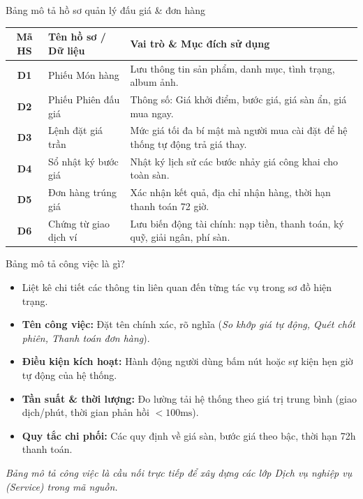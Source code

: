 \documentclass[aspectratio=169, 10pt]{beamer}
\begin{document}
\begin{frame}{Bảng mô tả hồ sơ quản lý đấu giá \& đơn hàng}
    \small
    \begin{table}[h]
        \centering
        \begin{tabular}{c l p{7.5cm}}
            \toprule
            \textbf{Mã HS} & \textbf{Tên hồ sơ / Dữ liệu} & \textbf{Vai trò \& Mục đích sử dụng} \\
            \midrule
            \textbf{D1} & Phiếu Món hàng & Lưu thông tin sản phẩm, danh mục, tình trạng, album ảnh. \\
            \textbf{D2} & Phiếu Phiên đấu giá & Thông số: Giá khởi điểm, bước giá, giá sàn ẩn, giá mua ngay. \\
            \textbf{D3} & Lệnh đặt giá trần & Mức giá tối đa bí mật mà người mua cài đặt để hệ thống tự động trả giá thay. \\
            \textbf{D4} & Sổ nhật ký bước giá & Nhật ký lịch sử các bước nhảy giá công khai cho toàn sàn. \\
            \textbf{D5} & Đơn hàng trúng giá & Xác nhận kết quả, địa chỉ nhận hàng, thời hạn thanh toán 72 giờ. \\
            \textbf{D6} & Chứng từ giao dịch ví & Lưu biến động tài chính: nạp tiền, thanh toán, ký quỹ, giải ngân, phí sàn. \\
            \bottomrule
        \end{tabular}
    \end{table}
\end{frame}

\begin{frame}{Bảng mô tả công việc là gì?}
    \begin{itemize}
        \item Liệt kê chi tiết các thông tin liên quan đến từng tác vụ trong sơ đồ hiện trạng.
        \item \textbf{Tên công việc:} Đặt tên chính xác, rõ nghĩa (\textit{So khớp giá tự động, Quét chốt phiên, Thanh toán đơn hàng}).
        \item \textbf{Điều kiện kích hoạt:} Hành động người dùng bấm nút hoặc sự kiện hẹn giờ tự động của hệ thống.
        \item \textbf{Tần suất \& thời lượng:} Đo lường tải hệ thống theo giá trị trung bình (giao dịch/phút, thời gian phản hồi $< 100\text{ms}$).
        \item \textbf{Quy tắc chi phối:} Các quy định về giá sàn, bước giá theo bậc, thời hạn 72h thanh toán.
    \end{itemize}
    \vspace{0.2cm}
    \textit{\color{secondarySlate}Bảng mô tả công việc là cầu nối trực tiếp để xây dựng các lớp Dịch vụ nghiệp vụ (Service) trong mã nguồn.}
\end{frame}
\end{document}
